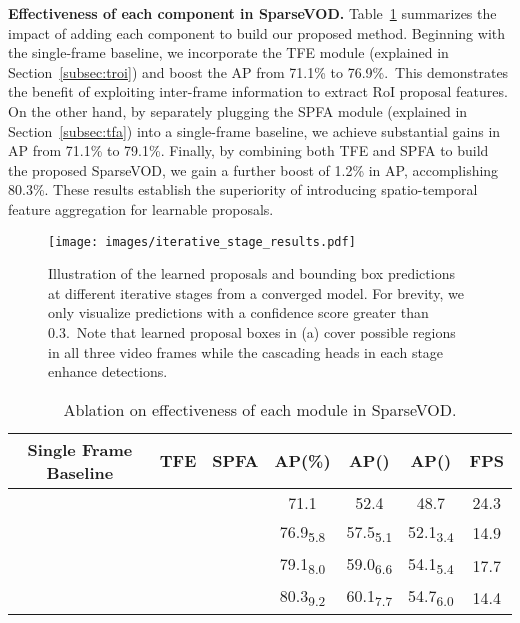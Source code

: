 \documentclass{bmvc2k}
\begin{document}
\vspace{3pt}
\noindent \textbf{Effectiveness of each component in SparseVOD.} 
\hspace{1pt}
Table~\ref{table:ablation_each_module} summarizes the impact of adding each component to build our proposed method. Beginning with the single-frame baseline, we incorporate the TFE module (explained in Section~\ref{subsec:troi}) and boost the AP from 71.1\% to 76.9\%.~This demonstrates the benefit of exploiting inter-frame information to extract RoI proposal features. On the other hand, by separately plugging the SPFA module (explained in Section~\ref{subsec:tfa}) into a single-frame baseline, we achieve substantial gains in AP from 71.1\% to 79.1\%. Finally, by combining both TFE and SPFA to build the proposed SparseVOD, we gain a further boost of 1.2\% in AP, accomplishing 80.3\%. These results establish the superiority of introducing spatio-temporal feature aggregation for learnable proposals.
\begin{figure}[H]
\centering
\vspace{-10pt}
\texttt{[image: images/iterative\_stage\_results.pdf]}
\vspace{-5pt}
\caption{Illustration of the learned proposals and bounding box predictions at different iterative stages from a converged model. For brevity, we only visualize predictions with a confidence score greater than 0.3.~Note that learned proposal boxes in (a) cover possible regions in all three video frames while the cascading heads in each stage enhance detections.}
\label{fig:iterative_results}
\vspace{-20pt}
\end{figure}
\newcommand{\cmark}{\ding{51}}\newcommand{\xmark}{\ding{55}}\begin{table}[H]
\small
\begin{center}
\begin{tabular}{ccc|cccc}
\toprule
Single Frame Baseline & TFE & SPFA  & AP(\%) &  AP()  &  AP()& FPS \\
\hline\noalign{\smallskip}
\textcolor{Green}{\cmark} & \color{red}\xmark & \color{red}\xmark  & 71.1 & 52.4 & 48.7 &  24.3 \\
 \color{Green}\cmark &  \color{Green}\cmark&  \color{red}\xmark & 76.9\textsubscript{5.8} & 57.5\textsubscript{5.1} &52.1\textsubscript{3.4} & 14.9 \\
 \color{Green}\cmark & \color{red}\xmark & \color{Green}\cmark& 79.1\textsubscript{8.0} & 59.0\textsubscript{6.6} & 54.1\textsubscript{5.4}& 17.7  \\
 \color{Green}\cmark &  \color{Green}\cmark& \color{Green}\cmark& 80.3\textsubscript{9.2} & 60.1\textsubscript{7.7} & 54.7\textsubscript{6.0} &  14.4 \\
\bottomrule
\end{tabular}
\end{center}
\vspace{-5pt}
\caption{Ablation on effectiveness of each module in SparseVOD.}
\label{table:ablation_each_module}
\vspace{-15pt}
\end{table}
\end{document}
